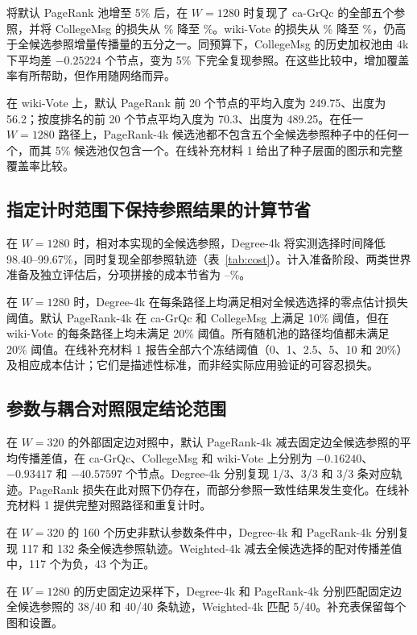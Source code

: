 \documentclass[smallextended]{svjour3}
\begin{document}
将默认 PageRank 池增至 5\% 后，在 $W=1280$ 时复现了 ca-GrQc 的全部五个参照，并将 CollegeMsg 的损失从 \CollegePRLoss{}\% 降至 \CollegePRfiveLoss{}\%。wiki-Vote 的损失从 \WikiPRLoss{}\% 降至 \WikiPRfiveLoss{}\%，仍高于全候选参照增量传播量的五分之一。同预算下，CollegeMsg 的历史加权池由 4k 下平均差 $-0.25224$ 个节点，变为 5\% 下完全复现参照。在这些比较中，增加覆盖率有所帮助，但作用随网络而异。

在 wiki-Vote 上，默认 PageRank 前 20 个节点的平均入度为 249.75、出度为 56.2；按度排名的前 20 个节点平均入度为 70.3、出度为 489.25。在任一 $W=1280$ 路径上，PageRank-4k 候选池都不包含五个全候选参照种子中的任何一个，而其 5\% 候选池仅包含一个。在线补充材料 1 给出了种子层面的图示和完整覆盖率比较。

\subsection{指定计时范围下保持参照结果的计算节省}
在 $W=1280$ 时，相对本实现的全候选参照，Degree-4k 将实测选择时间降低 98.40--99.67\%，同时复现全部参照轨迹（表~\ref{tab:cost}）。计入准备阶段、两类世界准备及独立评估后，分项拼接的成本节省为 \CollegeDegreeSaving{}--\WikiDegreeSaving{}\%。


在 $W=1280$ 时，Degree-4k 在每条路径上均满足相对全候选选择的零点估计损失阈值。默认 PageRank-4k 在 ca-GrQc 和 CollegeMsg 上满足 10\% 阈值，但在 wiki-Vote 的每条路径上均未满足 20\% 阈值。所有随机池的路径均值都未满足 20\% 阈值。在线补充材料 1 报告全部六个冻结阈值（0、1、2.5、5、10 和 20\%）及相应成本估计；它们是描述性标准，而非经实际应用验证的可容忍损失。

\subsection{参数与耦合对照限定结论范围}

在 $W=320$ 的外部固定边对照中，默认 PageRank-4k 减去固定边全候选参照的平均传播差值，在 ca-GrQc、CollegeMsg 和 wiki-Vote 上分别为 $-0.16240$、$-0.93417$ 和 $-40.57597$ 个节点。Degree-4k 分别复现 1/3、3/3 和 3/3 条对应轨迹。PageRank 损失在此对照下仍存在，而部分参照一致性结果发生变化。在线补充材料 1 提供完整对照路径和重复计时。

在 $W=320$ 的 160 个历史非默认参数条件中，Degree-4k 和 PageRank-4k 分别复现 117 和 132 条全候选参照轨迹。Weighted-4k 减去全候选选择的配对传播差值中，117 个为负，43 个为正。

在 $W=1280$ 的历史固定边采样下，Degree-4k 和 PageRank-4k 分别匹配固定边全候选参照的 38/40 和 40/40 条轨迹，Weighted-4k 匹配 5/40。补充表保留每个图和设置。
\FloatBarrier
\end{document}

